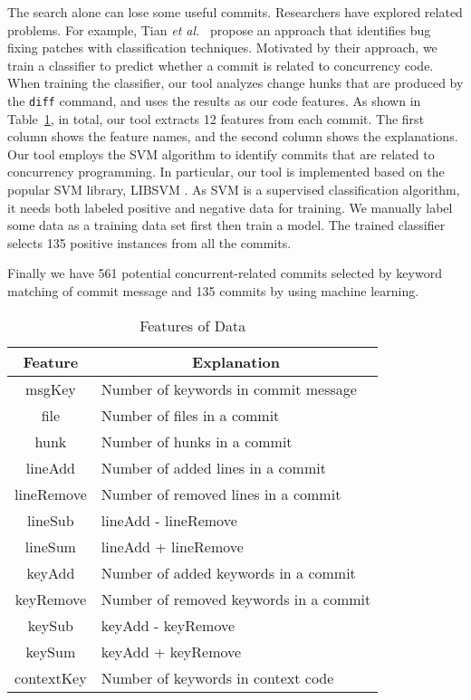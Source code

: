The search alone can lose some useful commits. Researchers have explored related problems. For example, Tian \emph{et al.}~\cite{conf/icse/TianLL12} propose an approach that identifies bug fixing patches with classification techniques. Motivated by their approach, we train a classifier to predict whether a commit is related to concurrency code. When training the classifier, our tool analyzes change hunks that are produced by the \texttt{diff} command, and uses the results as our code features. As shown in Table~\ref{table:feature}, in total, our tool extracts 12 features from each commit. The first column shows the feature names, and the second column shows the explanations.
Our tool employs the SVM \cite{journals/ml/CortesV95} algorithm to identify commits that are related to concurrency programming. In particular, our tool is implemented based on the popular SVM library, LIBSVM \cite{libsvm}. As SVM is a supervised classification algorithm, it needs both labeled positive and negative data for training. We manually label some data as a training data set first then train a model. The trained classifier selects 135 positive instances from all the commits.


Finally we have 561 potential concurrent-related commits selected by keyword matching of commit message and 135 commits by using machine learning.

\begin{table}
	\centering
	\caption{Features of Data}
\label{table:feature}
	\begin{tabular}{|c|l|}\hline
		Feature&\multicolumn{1}{|c|}{Explanation}\\\hline
		msgKey&Number of keywords in commit message\\
		file&Number of files in a commit\\
		hunk&Number of hunks in a commit\\
		lineAdd&Number of added lines in a commit\\
		lineRemove&Number of removed lines in a commit\\
		lineSub&lineAdd - lineRemove\\
		lineSum&lineAdd + lineRemove\\
		keyAdd&Number of added keywords in a commit\\
		keyRemove&Number of removed keywords in a commit\\
		keySub&keyAdd - keyRemove\\
		keySum&keyAdd + keyRemove\\
		contextKey&Number of keywords in context code\\\hline
	\end{tabular}
\end{table}

